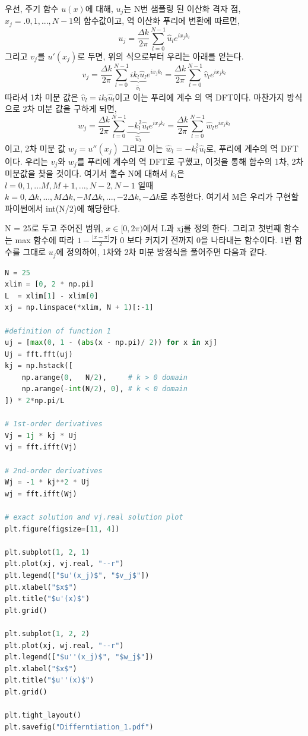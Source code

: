 \documentclass[11pt]{article}
\begin{document}
우선, 주기 함수 $u(x)$에 대해, $u_j$는 N번 샘플링 된 이산화 격자 점, $x_j =.0, 1, ... , N - 1$의 함수값이고, 역 이산화 푸리에 변환에 따르면, 
\begin{equation}
u_j = \frac{\Delta k}{2\pi} \sum_{l = 0}^{N - 1} \hat u_l e^{i x_j k_l}
\end{equation}
그리고 $v_j$를 $u'(x_j)$로 두면, 위의 식으로부터 우리는 아래를 얻는다.
\begin{equation}
v_j = \frac{\Delta k}{2\pi} \sum_{l = 0}^{N - 1}
\underbrace{i k_l \hat u_l}_{\hat v_l}
e^{i x_j k_l}
= \frac{\Delta k}{2\pi} \sum_{l = 0}^{N - 1} \hat v_l e^{i x_j k_l}
\end{equation}
따라서 1차 미분 값은 $\hat v_l = ik_l\hat u_l$이고 이는 푸리에 계수  의 역 DFT이다. 마찬가지 방식으로 2차 미분 값을 구하게 되면,
\begin{equation}
w_j = \frac{\Delta k}{2\pi} \sum_{l = 0}^{N - 1}
\underbrace{-k_l^2 \hat u_l}_{\hat w_l}
e^{i x_j k_l}
= \frac{\Delta k}{2\pi} \sum_{l = 0}^{N - 1} \hat w_l e^{i x_j k_l}
\end{equation}
이고, 2차 미분 값 $w_j = u''(x_j)$ 그리고 이는 $\hat w_l = -k_l^2 \hat u_l$로,  푸리에 계수의 역 DFT이다. 우리는 $v_j$와  $w_j$를 푸리에 계수의 역 DFT로 구했고, 이것을 통해 함수의 1차, 2차 미분값을 찾을 것이다. 여기서 홀수 N에 대해서 $k_l$은 $l = 0, 1, ... M, M + 1, ..., N - 2, N - 1$ 일때 $k = 0, \Delta k, ... ,M\Delta k, -M\Delta k, ... , -2\Delta k, -\Delta k$로 추정한다. 여기서 M은 우리가 구현할 파이썬에서 int(N/2)에 해당한다.

N = 25로 두고 주어진 범위, $x \in [0, 2\pi)$에서 L과 xj를 정의 한다. 그리고 첫번째 함수는 max 함수에 따라 $1 - \frac{|x - \pi|}{2}$가 0 보다 커지기 전까지 0을 나타내는 함수이다. 1번 함수를 그대로 $u_j$에 정의하여, 1차와 2차 미분 방정식을 풀어주면 다음과 같다.

\begin{lstlisting}[language=Python]
N = 25
xlim = [0, 2 * np.pi]
L  = xlim[1] - xlim[0]
xj = np.linspace(*xlim, N + 1)[:-1]

#definition of function 1
uj = [max(0, 1 - (abs(x - np.pi)/ 2)) for x in xj]
Uj = fft.fft(uj)
kj = np.hstack([
    np.arange(0,   N/2),     # k > 0 domain
    np.arange(-int(N/2), 0), # k < 0 domain
]) * 2*np.pi/L

# 1st-order derivatives
Vj = 1j * kj * Uj
vj = fft.ifft(Vj)

# 2nd-order derivatives
Wj = -1 * kj**2 * Uj
wj = fft.ifft(Wj)

# exact solution and vj.real solution plot
plt.figure(figsize=[11, 4])

plt.subplot(1, 2, 1)
plt.plot(xj, vj.real, "--r")
plt.legend(["$u'(x_j)$", "$v_j$"])
plt.xlabel("$x$")
plt.title("$u'(x)$")
plt.grid()

plt.subplot(1, 2, 2)
plt.plot(xj, wj.real, "--r")
plt.legend(["$u''(x_j)$", "$w_j$"])
plt.xlabel("$x$")
plt.title("$u''(x)$")
plt.grid()

plt.tight_layout()
plt.savefig("Differntiation_1.pdf")
\end{lstlisting}
\end{document}

